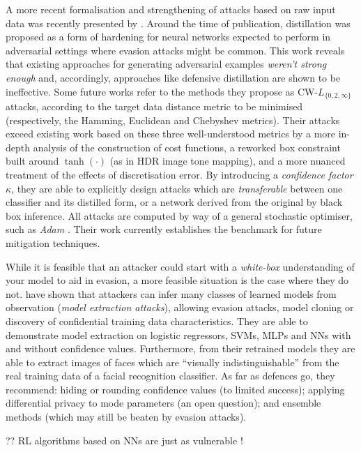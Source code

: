 A more recent formalisation and strengthening of attacks based on raw input data was recently presented by \textcite{DBLP:conf/sp/Carlini017}.
Around the time of publication, distillation \cite{DBLP:conf/sp/PapernotM0JS16} was proposed as a form of hardening for neural networks expected to perform in adversarial settings where evasion attacks might be common.
This work reveals that existing approaches for generating adversarial examples \emph{weren't strong enough} and, accordingly, approaches like defensive distillation are shown to be ineffective.
Some future works refer to the methods they propose as CW-$L_{\{0, 2, \infty\}}$ attacks, according to the target data distance metric to be minimised (respectively, the Hamming, Euclidean and Chebyshev metrics).
Their attacks exceed existing work based on these three well-understood metrics by a more in-depth analysis of the construction of cost functions, a reworked box constraint built around $\tanh(\cdot)$ (as in HDR image tone mapping), and a more nuanced treatment of the effects of discretisation error.
By introducing a \emph{confidence factor} $\kappa$, they are able to explicitly design attacks which are \emph{transferable} between one classifier and its distilled form, or a network derived from the original by black box inference.
All attacks are computed by way of a general stochastic optimiser, such as \emph{Adam} \cite{DBLP:journals/corr/KingmaB14}.
Their work currently establishes the benchmark for future mitigation techniques.

While it is feasible that an attacker could start with a \emph{white-box} understanding of your model to aid in evasion, a more feasible situation is the case where they do not.
\textcite{DBLP:conf/uss/TramerZJRR16} have shown that attackers can infer many classes of learned models from observation (\emph{model extraction attacks}), allowing evasion attacks, model cloning or discovery of confidential training data characteristics.
They are able to demonstrate model extraction on logistic regressors, SVMs, MLPs and NNs with and without confidence values.
Furthermore, from their retrained models they are able to extract images of faces which are ``visually indistinguishable'' from the real training data of a facial recognition classifier.
As far as defences go, they recommend: hiding or rounding confidence values (to limited success); applying differential privacy to mode parameters (an open question); and ensemble methods (which may still be beaten by evasion attacks).

?? RL algorithms based on NNs are just as vulnerable \cite{DBLP:journals/corr/HuangPGDA17}!

